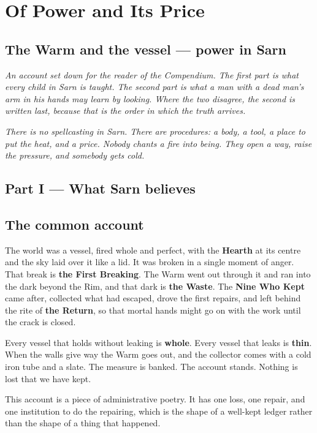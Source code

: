 \documentclass{design/chronicle}
\begin{document}
\chapter*{Of Power and Its Price}
\section*{The Warm and the vessel — power in Sarn}

\emph{An account set down for the reader of the Compendium. The first part is what every child in Sarn is taught. The second part is what a man with a dead man’s arm in his hands may learn by looking. Where the two disagree, the second is written last, because that is the order in which the truth arrives.}

\emph{There is no spellcasting in Sarn. There are procedures: a body, a tool, a place to put the heat, and a price. Nobody chants a fire into being. They open a way, raise the pressure, and somebody gets cold.}

\CRrule

\section*{Part I — What Sarn believes}

\section*{The common account}

The world was a vessel, fired whole and perfect, with the \textbf{Hearth} at its centre and the sky laid over it like a lid. It was broken in a single moment of anger. That break is \textbf{the First Breaking}. The Warm went out through it and ran into the dark beyond the Rim, and that dark is \textbf{the Waste}. The \textbf{Nine Who Kept} came after, collected what had escaped, drove the first repairs, and left behind the rite of \textbf{the Return}, so that mortal hands might go on with the work until the crack is closed.

Every vessel that holds without leaking is \textbf{whole}. Every vessel that leaks is \textbf{thin}. When the walls give way the Warm goes out, and the collector comes with a cold iron tube and a slate. The measure is banked. The account stands. Nothing is lost that we have kept.

This account is a piece of administrative poetry. It has one loss, one repair, and one institution to do the repairing, which is the shape of a well-kept ledger rather than the shape of a thing that happened.
\end{document}
